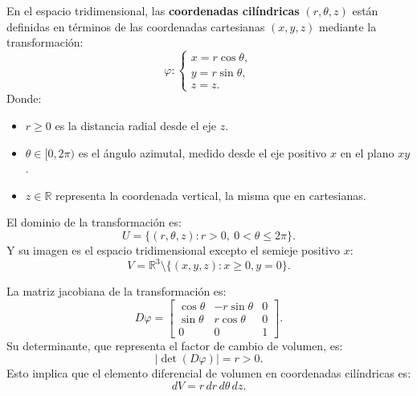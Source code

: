 \begin{definición}
En el espacio tridimensional, las \textbf{coordenadas cilíndricas} $(r, \theta, z)$ están definidas en términos de las coordenadas cartesianas $(x, y, z)$ mediante la transformación:
$$
    \varphi:
    \begin{cases}
        x = r\cos\theta, \\
        y = r\sin\theta, \\
        z = z.
    \end{cases}
$$
Donde:
\begin{itemize}
    \item $r \geq 0$ es la distancia radial desde el eje $z$.
    \item $\theta \in [0, 2\pi)$ es el ángulo azimutal, medido desde el eje positivo $x$ en el plano $xy$.
    \item $z \in \mathbb{R}$ representa la coordenada vertical, la misma que en cartesianas.
\end{itemize}

El dominio de la transformación es: $$ U = \{(r, \theta, z) : r > 0, \ 0 <
    \theta \leq 2\pi\}. $$ Y su imagen es el espacio tridimensional excepto el
semieje positivo $x$: $$ V = \mathbb{R}^3 \setminus \{ (x,y,z) : x \geq 0, y =
    0\}. $$

La matriz jacobiana de la transformación es: $$ D\varphi =
    \begin{bmatrix}
        \cos\theta & -r\sin\theta & 0 \\
        \sin\theta & r\cos\theta  & 0 \\
        0          & 0            & 1
    \end{bmatrix}.
$$
Su determinante, que representa el factor de cambio de volumen, es:
$$
    \left| \det(D\varphi) \right| = r > 0.
$$
Esto implica que el elemento diferencial de volumen en coordenadas cilíndricas es:
$$
    dV = r \, dr \, d\theta \, dz.
$$
\end{definición}

